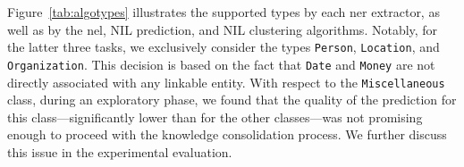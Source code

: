 Figure~\ref{tab:algotypes} illustrates the supported types by each \ac{ner} extractor, as well as by the \ac{nel}, NIL prediction, and NIL clustering algorithms. Notably, for the latter three tasks, we exclusively consider the types \texttt{Person}, \texttt{Location}, and \texttt{Organization}. This decision is based on the fact that \texttt{Date} and \texttt{Money} are not directly associated with any linkable entity. With respect to the \texttt{Miscellaneous} class, during an exploratory phase, we found that the quality of the prediction for this class---significantly lower than for the other classes---was not promising enough to proceed with the knowledge consolidation process. We further discuss this issue in the experimental evaluation.



